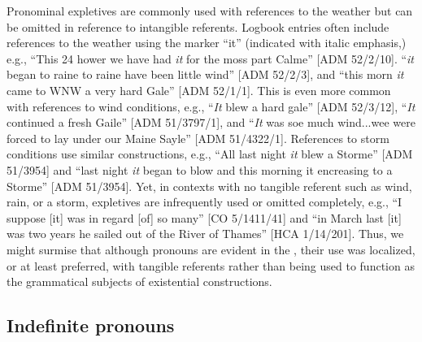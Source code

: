Pronominal expletives are commonly used with references to the weather but can be omitted in reference to intangible referents.  Logbook entries often include references to the weather using the  marker “it” (indicated with italic emphasis,) e.g., “This 24 hower we have had \textit{it} for the moss part Calme” [ADM 52/2/10]. “\textit{it} began to raine to raine have been little wind” [ADM 52/2/3], and “this morn \textit{it} came to WNW a very hard Gale” [ADM 52/1/1]. This is even more common with references to wind conditions, e.g., “\textit{It} blew a hard gale” [ADM 52/3/12], “\textit{It} continued a fresh Gaile” [ADM 51/3797/1], and “\textit{It} was soe much wind...wee were forced to lay under our Maine Sayle” [ADM 51/4322/1]. References to storm conditions use similar constructions, e.g., “All last night \textit{it} blew a Storme” [ADM 51/3954] and “last night \textit{it} began to blow and this morning it encreasing to a Storme” [ADM 51/3954]. Yet, in contexts with no tangible referent such as wind, rain, or a storm, expletives are infrequently used or omitted completely, e.g., “I suppose [it] was in regard [of] so many” [CO 5/1411/41] and “in March last [it] was two years he sailed out of the River of Thames” [HCA 1/14/201]. Thus, we might surmise that although  pronouns are evident in the , their use was localized, or at least preferred, with tangible referents rather than being used to function as the grammatical subjects of existential constructions.

\subsection{{Indefinite pronouns}}%

